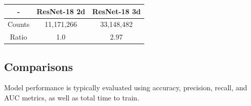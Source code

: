 \begin{center}
 \begin{tabular}{||c c c||}
 \hline
 - & ResNet-18 2d & ResNet-18 3d \\ [0.5ex]
 \hline\hline
 Counts & 11,171,266 & 33,148,482 \\ [1ex]
 \hline
 Ratio & 1.0 & 2.97 \\ [1ex]
 \hline
\end{tabular}
\end{center}

\subsection{Comparisons}\label{subsec:comparisons}

Model performance is typically evaluated using accuracy, precision, recall, and AUC metrics, as well as total time to
train.
